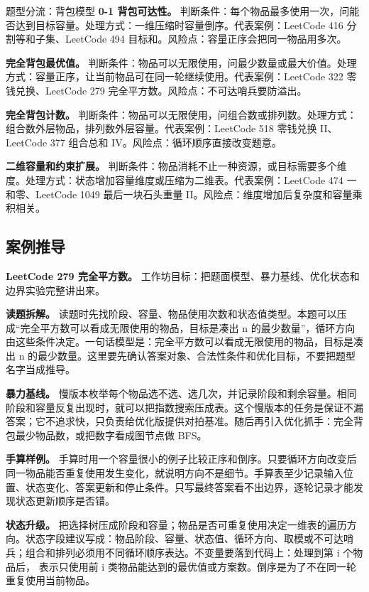 \begin{principlebox}{题型分流：背包模型}
\textbf{0-1 背包可达性。}
判断条件：每个物品最多使用一次，问能否达到目标容量。处理方式：一维压缩时容量倒序。代表案例：LeetCode 416 分割等和子集、LeetCode 494 目标和。风险点：容量正序会把同一物品用多次。

\textbf{完全背包最优值。}
判断条件：物品可以无限使用，问最少数量或最大价值。处理方式：容量正序，让当前物品可在同一轮继续使用。代表案例：LeetCode 322 零钱兑换、LeetCode 279 完全平方数。风险点：不可达哨兵要防溢出。

\textbf{完全背包计数。}
判断条件：物品可以无限使用，问组合数或排列数。处理方式：组合数外层物品，排列数外层容量。代表案例：LeetCode 518 零钱兑换 II、LeetCode 377 组合总和 IV。风险点：循环顺序直接改变题意。

\textbf{二维容量和约束扩展。}
判断条件：物品消耗不止一种资源，或目标需要多个维度。处理方式：状态增加容量维度或压缩为二维表。代表案例：LeetCode 474 一和零、LeetCode 1049 最后一块石头重量 II。风险点：维度增加后复杂度和容量乘积相关。

\end{principlebox}

\subsection{案例推导}

\noindent\textbf{LeetCode 279 完全平方数。} 工作坊目标：把题面模型、暴力基线、优化状态和边界实验完整讲出来。

\textbf{读题拆解。} 读题时先找阶段、容量、物品使用次数和状态值类型。本题可以压成“完全平方数可以看成无限使用的物品，目标是凑出 n 的最少数量”，循环方向由这些条件决定。一句话模型是：完全平方数可以看成无限使用的物品，目标是凑出 n 的最少数量。这里要先确认答案对象、合法性条件和优化目标，不要把题型名字当成推导。

\textbf{暴力基线。} 慢版本枚举每个物品选不选、选几次，并记录阶段和剩余容量。相同阶段和容量反复出现时，就可以把指数搜索压成表。这个慢版本的任务是保证不漏答案；它不追求快，只负责给优化版提供对拍基准。随后再引入优化抓手：完全背包最少物品数，或把数字看成图节点做 BFS。

\textbf{手算样例。} 手算时用一个容量很小的例子比较正序和倒序。只要循环方向改变后同一物品能否重复使用发生变化，就说明方向不是细节。手算表至少记录输入位置、状态变化、答案更新和停止条件。只写最终答案看不出边界，逐轮记录才能发现状态更新顺序是否错。

\textbf{状态升级。} 把选择树压成阶段和容量；物品是否可重复使用决定一维表的遍历方向。状态字段建议写成：物品阶段、容量、状态值、循环方向、取模或不可达哨兵；组合和排列必须用不同循环顺序表达。不变量要落到代码上：处理到第 i 个物品后， 表示只使用前 i 类物品能达到的最优值或方案数。倒序是为了不在同一轮重复使用当前物品。

